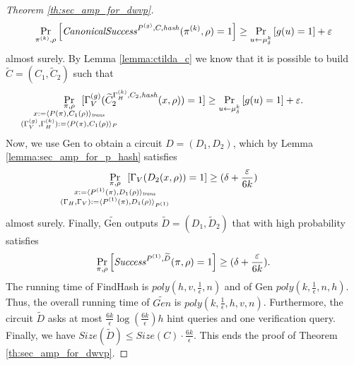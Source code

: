 \begin{proof}[Theorem \ref{th:sec_amp_for_dwvp}]
\begin{align*}
    \underset{\pi^{(k)}, \rho}{\Pr}\left[\operatorname{\mathit{CanonicalSuccess}}^{P^{(g)}, C, \operatorname{\mathit{hash}}}(\pi^{(k)}, \rho) = 1\right] \geq \underset{u \leftarrow \mu_\delta^k}{\Pr}\left[g(u) = 1\right] + \varepsilon
\end{align*}
almost surely.
By Lemma \ref{lemma:ctilda_c} we know that it is possible to build $\widetilde{C} = (C_1, \widetilde{C}_2)$ such that
\begin{align*}
    \underset{
      \mathclap {
      \substack{\pi, \rho \\
        x := \langle P(\pi), C_1(\rho) \rangle_{\mathit{trans}} \\
        (\Gamma_V^{(g)}, \Gamma_H^{(k)}) := \langle P(\pi), C_1(\rho) \rangle_{P}
      }}}
    {\Pr}\mkern13mu[\Gamma_V^{(g)}(\widetilde{C}_2^{\Gamma_H^{(k)}, C_2, \hash}(x, \rho)) = 1]
    \geq
\underset{u \leftarrow \mu_\delta^k}{\Pr}\left[g(u) = 1\right] + \varepsilon.
\end{align*}
Now, we use Gen to obtain a circuit $D = (D_1, D_2)$, which by Lemma \ref{lemma:sec_amp_for_p_hash} satisfies
\begin{align}
  \label{eq:succ_prob_d}
    \underset{
      \mathclap{
      \substack{\pi, \rho \\ x := \langle P^{(1)}(\pi), D_1(\rho) \rangle_{\mathit{trans}} \\
        (\Gamma_H, \Gamma_V) := \langle P^{(1)}(\pi), D_1(\rho) \rangle_{P^{(1)}}}}}
    {\Pr}\mkern13mu[\Gamma_V(D_2(x, \rho)) = 1] \geq (\delta + \frac{\varepsilon}{6k})
\end{align}
almost surely.
Finally, $\widetilde{\text{Gen}}$ outputs $\widetilde{D} = (D_1, \widetilde{D}_2)$ that with high probability satisfies
\begin{align*}
    \underset{\pi, \rho}{\Pr}\left[\operatorname{\mathit{Success}}^{P^{(1)},\widetilde{D}}(\pi, \rho) = 1\right] \geq (\delta + \frac{\varepsilon}{6k}).
\end{align*}
The running time of FindHash is $\mathit{poly(h,v,\frac{1}{\epsilon},n)}$  and of Gen $\mathit{poly(k, \frac{1}{\epsilon}, n, h)}$.
Thus, the overall running time of $\widetilde{\mathit{Gen}}$ is  $\mathit{poly(k,\frac{1}{\epsilon},h,v,n)}$.
Furthermore, the circuit $\widetilde{D}$ asks at most $\frac{6k}{\epsilon} \log(\frac{6k}{\epsilon})h$ hint queries and one verification query.
Finally, we have $\mathit{Size}(\widetilde{D}) \leq \mathit{Size}(C) \cdot \frac{6k}{\epsilon}$.
This ends the proof of Theorem \ref{th:sec_amp_for_dwvp}.
\end{proof}

